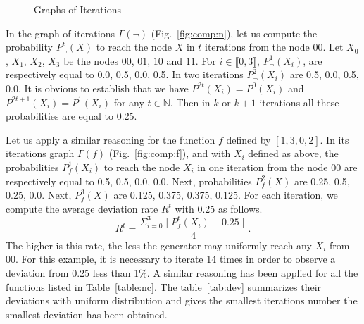 \begin{figure}[ht]
  \centering
  \caption{Graphs of Iterations}
    \label{fig:xplgraph}
\end{figure}

In the graph of iterations $\Gamma({\neg})$ (Fig.~\ref{fig:comp:n}), 
let us compute the probability $P^t_{\neg}(X)$ to reach the node $X$ in $t$ iterations 
from the node 00. Let $X_0$, $X_1$, $X_2$, $X_3$ be the nodes   
$00$, $01$, $10$ and $11$.
For $i\in \llbracket 0,3 \rrbracket$,  $P^1_{\neg}(X_i)$,  are respectively equal to 
0.0, 0.5, 0.0, 0.5. In two iterations   $P^2_{\neg}(X_i)$
are 0.5, 0.0, 0.5, 0.0.
It is obvious to establish that we have 
$P^{2t}(X_i) = P^{0}(X_i)$ and $P^{2t+1}(X_i) = P^{1}(X_i)$ for any $t\in \mathds{N}$.
Then in $k$ or $k+1$ iterations all these probabilities are equal to 0.25.  

Let us apply a similar reasoning for the function $f$ defined by $[1,3,0,2]$.
In its iterations graph $\Gamma(f)$ (Fig.~\ref{fig:comp:f}),
and with $X_i$ defined as above,
the probabilities $P^1_{f}(X_i)$ to reach the node $X_i$ 
in one iteration  from the node 00
are respectively equal to 
0.5, 0.5, 0.0, 0.0.  
Next, probabilities  $P^2_{f}(X)$  are 0.25, 0.5, 0.25, 0.0. 
Next, $P^3_{f}(X)$  are 0.125, 0.375, 0.375, 0.125.
For each iteration, we compute the average deviation rate $R^t$ 
with 0.25 as follows.
$$
R^t= \dfrac{ \Sigma_{i=0}^3 \mid P^t_{f}(X_i)-0.25 \mid}
{4}.
$$  
The higher is this rate, the less the generator may uniformly reach any $X_i$ from $00$.
For this example, it is necessary to iterate 14 times in order to
observe a deviation from 0.25 less 
than 1\%. 
A similar reasoning has been applied for all the functions listed in Table~\ref{table:nc}.
The table~\ref{tab:dev} summarizes their deviations with uniform distribution and gives the 
smallest iterations number the smallest deviation has been obtained. 

